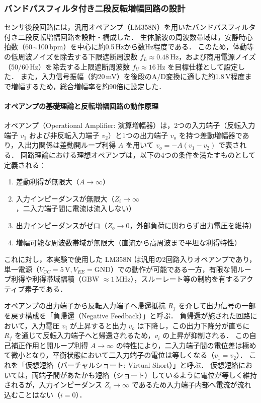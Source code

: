 \subsubsection{バンドパスフィルタ付き二段反転増幅回路の設計}

センサ後段回路には，汎用オペアンプ（LM358N）を用いたバンドパスフィルタ付き二段反転増幅回路を設計・構成した．
生体脈波の周波数帯域は，安静時心拍数（60$\sim$100\,bpm）を中心に約0.5\,Hzから数Hz程度である．
このため，体動等の低周波ノイズを除去する下限遮断周波数 $f_L \approx 0.48\,\mathrm{Hz}$，および商用電源ノイズ（50/60\,Hz）を除去する上限遮断周波数 $f_U \approx 16\,\mathrm{Hz}$ を目標仕様として設定した．
また，入力信号振幅（約20\,mV）を後段のA/D変換に適した約1.8\,V程度まで増幅するため，総合増幅率を約90倍に設定した．

\paragraph{オペアンプの基礎理論と反転増幅回路の動作原理}
オペアンプ（Operational Amplifier: 演算増幅器）は，2つの入力端子（反転入力端子 $v_1$ および非反転入力端子 $v_2$）と1つの出力端子 $v_o$ を持つ差動増幅器であり，入出力関係は差動開ループ利得 $A$ を用いて $v_o = -A(v_1 - v_2)$ で表される．
回路理論における理想オペアンプは，以下の4つの条件を満たすものとして定義される：
\begin{enumerate}
  \item 差動利得が無限大（$A \to \infty$）
  \item 入力インピーダンスが無限大（$Z_i \to \infty$，二入力端子間に電流は流入しない）
  \item 出力インピーダンスがゼロ（$Z_o \to 0$，外部負荷に関わらず出力電圧を維持）
  \item 増幅可能な周波数帯域が無限大（直流から高周波まで平坦な利得特性）
\end{enumerate}
これに対し，本実験で使用した LM358N は汎用の2回路入りオペアンプであり，単一電源（$V_{CC} = 5\,\mathrm{V}, V_{EE} = \mathrm{GND}$）での動作が可能である一方，有限な開ループ利得や利得帯域幅積（GBW $\approx 1\,\mathrm{MHz}$），スルーレート等の制約を有するアクティブ素子である．

オペアンプの出力端子から反転入力端子へ帰還抵抗 $R_f$ を介して出力信号の一部を戻す構成を「負帰還（Negative Feedback）」と呼ぶ．
負帰還が施された回路において，入力電圧 $v_i$ が上昇すると出力 $v_o$ は下降し，この出力下降分が直ちに $R_f$ を通じて反転入力端子へと帰還されるため，$v_i$ の上昇が抑制される．
この自己補正作用と開ループ利得 $A \to \infty$ の特性により，二入力端子間の電位差は極めて微小となり，平衡状態において二入力端子の電位は等しくなる（$v_1 = v_2$）．
これを「仮想短絡（バーチャルショート: Virtual Short）」と呼ぶ．
仮想短絡においては，両端子間があたかも短絡（ショート）しているように電位が等しく維持されるが，入力インピーダンス $Z_i \to \infty$ であるため入力端子内部へ電流が流れ込むことはない（$i = 0$）．

